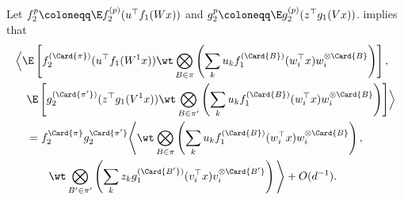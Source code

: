 Let \(f_2^{p} \coloneqq \E f_2^{(p)}(u^\top f_1(Wx))\) and \(g_2^{p} \coloneqq \E g_2^{(p)}(z^\top g_1(Vx))\). 
 implies that
    \begin{equation}
    \begin{aligned}
        &\Bigl\langle\E \left[f_2^{(\Card{\pi})}(u^\top f_1(W^1 x)) \wt \bigotimes_{B \in \pi} \left(
        \sum_k u_k f_1^{(\Card{B})} (w_i^\top x) w_i^{\otimes \Card{B}}\right)\right], \\
        &\quad \E \left[g_2^{(\Card{\pi'})}(z^\top g_1(V^1 x)) \wt \bigotimes_{B \in \pi'} \left(
        \sum_k u_k f_1^{(\Card{B})} (w_i^\top x) w_i^{\otimes \Card{B}}\right)\right]\Bigr\rangle \\
        & \quad = f_2^{\Card{\pi}} g_2^{\Card{\pi'}} 
        \Bigg\langle\wt\bigotimes_{B \in \pi} \left(
        \sum_k u_k f_1^{(\Card{B})} (w_i^\top x) w_i^{\otimes \Card{B}}\right),\\ 
        &\qquad \quad \wt\bigotimes_{B' \in \pi'} \left(
        \sum_k z_k g_1^{(\Card{B'})} (v_i^\top x) v_i^{\otimes \Card{B'}}\right)\Bigg\rangle + O(d^{-1}).
    \end{aligned}
    \end{equation}

